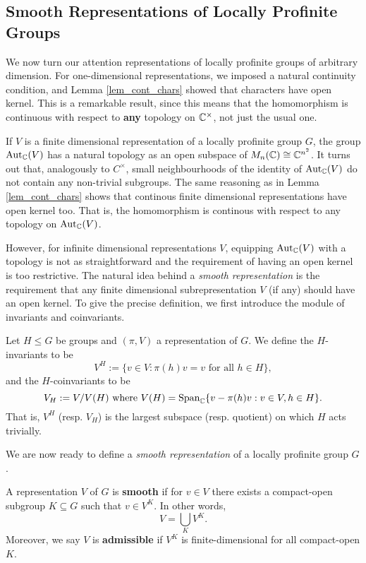 \subsection{Smooth Representations of Locally Profinite Groups}

We now turn our attention representations of locally profinite groups of arbitrary dimension. For one-dimensional representations, we imposed a natural continuity condition, and Lemma \ref{lem_cont_chars} showed that characters have open kernel. This is a remarkable result, since this means that the homomorphism is continuous with respect to \textbf{any} topology on $\mathbb{C}^{\times}$, not just the usual one.

If $V$ is a finite dimensional representation of a locally profinite group $G$, the group $\mathrm{Aut}_{\mathbb{C}}(V)$ has a natural topology as an open subspace of $M_n(\mathbb{C})\cong\mathbb{C}^{n^2}$. It turns out that, analogously to $C^{\times}$, small neighbourhoods of the identity of $\mathrm{Aut}_{\mathbb{C}}(V)$ do not contain any non-trivial subgroups. The same reasoning as in Lemma \ref{lem_cont_chars} shows that continous finite dimensional representations have open kernel too. That is, the homomorphism is continous with respect to any topology on $\mathrm{Aut}_{\mathbb{C}}(V)$.

However, for infinite dimensional representations $V$, equipping $\mathrm{Aut}_{\mathbb{C}}(V)$ with a topology is not as straightforward and the requirement of having an open kernel is too restrictive. The natural idea behind a \textit{smooth representation} is the requirement that any finite dimensional subrepresentation $V$ (if any) should have an open kernel. To give the precise definition, we first introduce the module of invariants and coinvariants.

\begin{defn}
    Let $H\leq G$ be groups and $(\pi,V)$ a representation of $G$. We define the $H$-invariants to be 
    $$V^{H}:=\{v\in V:\pi(h)v=v\text{ for all }h\in H\},$$
    and the $H$-coinvariants to be 
    $$V_H:=V/V(H)\text{ where } V(H)=\textrm{Span}_{\mathbb{C}}\{v-\pi(h)v:v\in V,h\in H\}.$$
    That is, $V^H$ (resp. $V_H$) is the largest subspace (resp. quotient) on which $H$ acts trivially.
\end{defn}

We are now ready to define a \textit{smooth representation} of a locally profinite group $G$.

\begin{defn}
	A representation $V$ of $G$ is \textbf{smooth} if for $v\in V$ there exists a compact-open subgroup $K\subseteq G$ such that $v\in V^K$. In other words,
    $$V=\bigcup_K V^K.$$
    Moreover, we say $V$ is \textbf{admissible} if $V^K$ is finite-dimensional for all compact-open $K$.
\end{defn}

